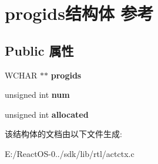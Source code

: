 \hypertarget{structprogids}{}\section{progids结构体 参考}
\label{structprogids}
\subsection*{Public 属性}
\begin{DoxyCompactItemize}
\item 
\mbox{\label{structprogids_a3b696a819bb1cd2167bdd721b08b4bd1}} 
W\+C\+H\+AR $\ast$$\ast$ {\bfseries progids}
\item 
\mbox{\label{structprogids_ac3bfad4e1e8334e226bded0bcb4b6fbb}} 
unsigned int {\bfseries num}
\item 
\mbox{\label{structprogids_a173fe71ac90b788e8e93a853517a9ed7}} 
unsigned int {\bfseries allocated}
\end{DoxyCompactItemize}


该结构体的文档由以下文件生成\+:\begin{DoxyCompactItemize}
\item 
E\+:/\+React\+O\+S-\/0../sdk/lib/rtl/actctx.\+c\end{DoxyCompactItemize}
